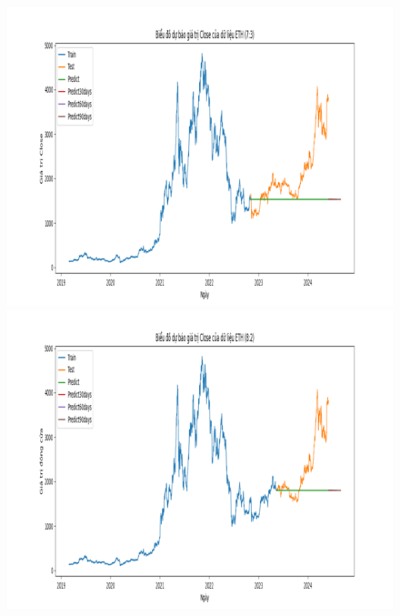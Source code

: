 \documentclass[conference]{IEEEtran}
\begin{document}
\begin{figure}[H]
    \centering
    \begin{minipage}{0.15\textwidth}
    \centering
    \includegraphics[width=1\textwidth]{Figure/ARIMA_ETH_73.png}
    \end{minipage}
    \hfill
    \begin{minipage}{0.15\textwidth}
    \centering
    \includegraphics[width=1\textwidth]{Figure/ARIMA_ETH_82.png}
    \end{minipage}
    \hfill
    \begin{minipage}{0.15\textwidth}
    \centering

\end{minipage}
\end{figure}
\end{document}
